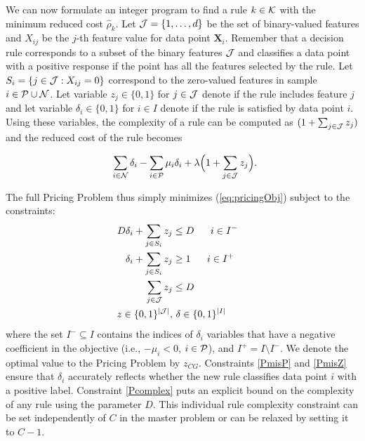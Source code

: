 \documentclass[twoside,11pt]{article}
\begin{document}
We can now formulate an integer program to find a rule $k\in\mathcal{K}$ with the minimum reduced cost $\hat \rho_k$.  Let $\mathcal{J} =\{ 1,\dots,d\} $ be the set of binary-valued features and $X_{ij}$ be the $j$-th feature value for data point $\textbf{X}_i$.
Remember that  a decision rule corresponds to a subset of the binary features ${\cal J}$  and classifies a data point with a positive response if the point has all the features selected by the rule. Let $S_i=\{j\in{\cal J}: X_{ij} = 0\}$ correspond to the zero-valued features %
in sample $i\in{\cal P}\cup {\cal N}$.
Let variable $z_j\in\{0,1\}$ for  $j\in {\cal J}$  denote if the rule includes feature $j$ and let variable  $\delta_i\in\{0,1\}$ for $i\in I$ denote if the rule is satisfied by data point $i$.
Using these variables, the complexity of a rule can be computed as $(1 + \sum_{j \in {\cal J}} z_j)$ and the reduced cost of the rule becomes

    \begin{equation} \label{eq:pricingObj}
     \enskip \sum_{i \in \mathcal{N}} \delta_i - \sum_{i \in \mathcal{P}} \mu_i \delta_i + 
     \lambda\Big(1 + \sum_{j \in {\cal J}} z_j\Big)  .
    \end{equation}




The full Pricing Problem thus simply minimizes (\ref{eq:pricingObj}) subject to the constraints:
    \begin{align}
	D\delta_i + \sum_{j \in S_i} z_j &\leq D ~~~~~ i \in I^{-}\quad \label{PmisP}\\
	\delta_i +  \sum_{j \in S_i} z_j &\geq  1~~~~~i \in I^{+}  \quad\label{PmisZ}\\
	\sum_{j \in {\cal J}} z_j &\leq D \quad \label{Pcomplex}\\
	z\in \{0,1\}^{\lvert{\cal J}\rvert},&~ \delta\in \{0,1\}^{\lvert I\rvert}\label{Pint}\qquad
	\end{align}
where the set $I^-\subseteq I$ contains the indices of $\delta_i$ variables that have a negative  coefficient in the objective (i.e., $-\mu_i < 0$, $i \in {\cal P}$), and $I^+=I\setminus I^-$. We denote the optimal value to the Pricing Problem by $z_{CG}$. Constraints \eqref{PmisP} and \eqref{PmisZ} ensure that $\delta_i$ accurately reflects whether the new rule classifies data point $i$ with a positive label. Constraint \eqref{Pcomplex} puts an explicit bound on the complexity of any rule using the parameter $D$. This individual rule complexity constraint can be set independently of $C$ in the master problem or can be relaxed by setting it to $C - 1$. 
\end{document}
